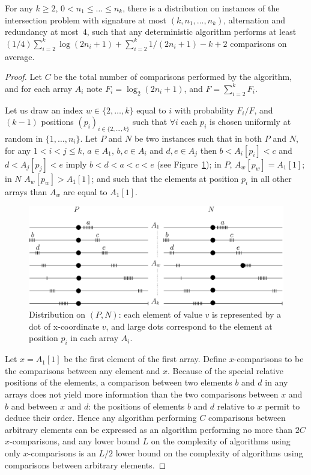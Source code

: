 \begin{lemma}\label{lem:elementproblem}
For any $k\geq 2$, $0{<}n_1{\leq}\ldots{\leq}n_k$, there is a
distribution on instances of the intersection problem with signature
at most $(k,n_1,\ldots,n_k)$, alternation and redundancy at most~$4$,
such that any deterministic algorithm performs at least
${(1/4)}\sum_{i=2}^k\log(2n_i+1)+\sum_{i=2}^k{1/(2n_i{+}1)}-k{+}2$
comparisons on average.
\end{lemma}
\begin{proof}
Let $C$ be the total number of comparisons performed by the algorithm,
and for each array $A_i$ note $F_i=\log_2(2n_i+1)$, and $F=\sum_{i=2}^k F_i$.

Let us draw an index $w\in\{2,\ldots,k\}$ equal to $i$ with probability
${F_i/F}$,
%
and $(k-1)$ positions $(p_i)_{i\in\{2,\ldots,k\}}$ such that $\forall i$
each $p_i$ is chosen uniformly at random in $\{1,\ldots,n_i\}$.
%
Let $P$ and $N$ be two instances such that
%
 in both $P$ and $N$, for any $1{<}i{<}j{\leq}k$, $a{\in}A_1$, 
$b,c{\in}A_i$ and $d,e{\in}A_j$ then  $b{<}A_i[p_i]{<}c$ and $d{<}A_j[p_j]{<}e$ imply 
$b{<}d{<}a{<}c{<}e$ (see Figure~\ref{fig:PandNdistribution});
%
in $P$, $A_{w}[p_{w}]{=}A_1[1]$; 
%
in $N$ $A_{w}[p_{w}]{>}A_1[1]$;
%
and such that the elements at position $p_i$ in all other arrays
than $A_w$ are equal to $A_1[1]$.

\begin{figure}
\centerline{\includegraphics[angle=0,width=12cm]{PNdistribution.eps}}
\caption{Distribution on $(P,N)$: each element of value $v$ is
represented by a dot of x-coordinate $v$, and large dots correspond to
the element at position $p_i$ in each array
$A_i$. \label{fig:PandNdistribution}}
\end{figure}

Let $x=A_1[1]$ be the first element of the first array.
%
Define $x$-comparisons to be the comparisons between any element and $x$.
%
Because of the special relative positions of the elements, a
comparison between two elements $b$ and $d$ in any arrays does not
yield more information than the two comparisons between $x$ and $b$
and between $x$ and $d$: the positions of elements $b$ and $d$
relative to $x$ permit to deduce their order.
%
Hence any algorithm performing $C$ comparisons between arbitrary
elements can be expressed as an algorithm performing no more than $2C$
$x$-comparisons, and any lower bound $L$ on the complexity of
algorithms using only $x$-comparisons is an $L/2$ lower bound on the
complexity of algorithms using comparisons between arbitrary elements.


\end{proof}
